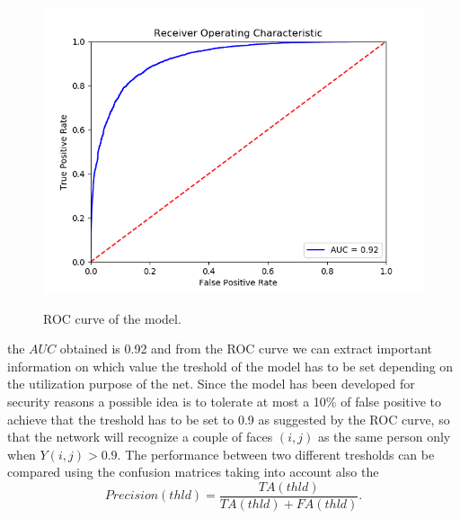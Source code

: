 \begin{figure}[t]
\begin{center}
\includegraphics[width=0.8\linewidth]{images/ROC.png}
   \caption{ROC curve of the model.}
\label{fig:long}
\label{fig:onecol}
\end{center}
\end{figure}

the $AUC$ obtained is 0.92 and from the ROC curve we can extract important information on which value the treshold of the model has to be set depending on the utilization purpose of the net.
Since the model has been developed for security reasons a possible idea is to tolerate at most a 10\% of false positive to achieve that the treshold has to be set to 0.9 as suggested by the ROC curve, so that the network will recognize a couple of faces $(i,j)$ as the same person only when $Y(i,j)>0.9$. The performance between two different tresholds can be compared using the confusion matrices taking into account also the
\begin{equation}
Precision(thld) = \frac{TA(thld)}{TA(thld)+FA(thld)}. 
\end{equation}
 
 

